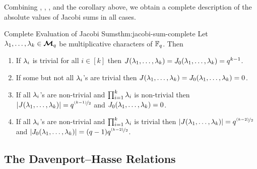 Combining , , , and the corollary above, we obtain a complete description of the absolute values of Jacobi sums in all cases.
\begin{Theorem}{Complete Evaluation of Jacobi Sums}{thm:jacobi-sum-complete}
  Let $\lambda_1,\dots,\lambda_k\in\boldsymbol{\mathcal{M}}_q$ be multiplicative characters of $\mathbb{F}_q$. Then
  \begin{enumerate}[label=(\roman*)]
    \item If $\lambda_i$ is trivial for all $i\in[k]$ then $J(\lambda_1,\dots,\lambda_k)=J_0(\lambda_1,\dots,\lambda_k)=q^{k-1}$.
    \item If some but not all $\lambda_i$'s are trivial then $J(\lambda_1,\dots,\lambda_k)=J_0(\lambda_1,\dots,\lambda_k)=0$.
    \item If all $\lambda_i$'s are non-trivial and $\prod_{i=1}^k\lambda_i$ is non-trivial then $|J(\lambda_1,\dots,\lambda_k)|=q^{\nicefrac{(k-1)}{2}}$ and $J_0(\lambda_1,\dots,\lambda_k)=0$.
    \item If all $\lambda_i$'s are non-trivial and $\prod_{i=1}^k\lambda_i$ is trivial then $|J(\lambda_1,\dots,\lambda_k)|=q^{\nicefrac{(k-2)}{2}}$ and $|J_0(\lambda_1,\dots,\lambda_k)|=(q-1)q^{\nicefrac{(k-2)}{2}}$.
  \end{enumerate}
\end{Theorem}

\subsection{The Davenport--Hasse Relations}

